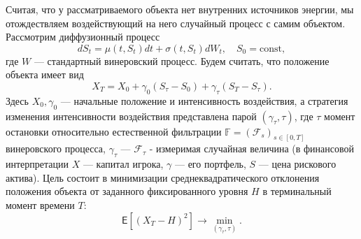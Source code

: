 Считая, что у рассматриваемого объекта нет внутренних источников энергии, мы отождествляем воздействующий на него случайный процесс с самим объектом. Рассмотрим диффузионный процесс
$$dS_t=\mu(t,S_t) dt+\sigma(t,S_t) dW_t, \quad S_0=\mathrm {const},$$
где $W$ --- стандартный винеровский процесс. Будем считать, что положение объекта имеет вид
$$X_T = X_0+\gamma_0(S_\tau-S_0) +\gamma_\tau(S_T-S_\tau).$$
Здесь $X_0, \gamma_0$ --- начальные положение и интенсивность воздействия, а стратегия изменения интенсивности воздействия представлена парой  $(\gamma_\tau,\tau)$, где $\tau$  момент остановки относительно естественной фильтрации $\mathbb F=(\mathscr F_s)_{s\in [0,T]}$ винеровского процесса,  $\gamma_\tau $ --- $\mathscr F_\tau$ - измеримая случайная величина (в финансовой интерпретации $X$ --- капитал игрока, $\gamma$ --- его портфель, $S$ --- цена рискового актива).
Цель состоит в минимизации среднеквадратического отклонения положения объекта от заданного фиксированного уровня $H$  в терминальный момент времени $T$:
\begin{equation}
\label{eq:4.1.1}
\mathsf E[(X_T-H)^2] \to \min_{(\gamma_\tau,\tau)}.
\end{equation}

